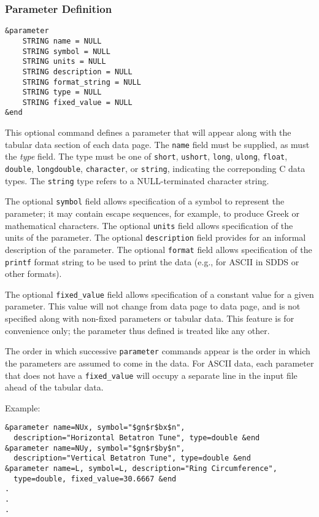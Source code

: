 \documentclass[11pt]{article}
\begin{document}
\subsubsection{Parameter Definition}
\begin{verbatim}
&parameter
    STRING name = NULL
    STRING symbol = NULL
    STRING units = NULL
    STRING description = NULL
    STRING format_string = NULL
    STRING type = NULL
    STRING fixed_value = NULL
&end
\end{verbatim}

This optional command defines a parameter that will appear along with the tabular data section of each data page.  The {\tt name} field must be supplied, as must the {\em type} field.  The type must be one of {\tt short}, {\tt ushort}, {\tt long}, {\tt ulong}, {\tt float}, {\tt double}, {\tt longdouble}, {\tt character}, or {\tt string}, indicating the correponding C data types.  The {\tt string} type refers to a NULL-terminated character string.

The optional {\tt symbol} field allows specification of a symbol to represent the parameter; it may contain escape sequences, for example, to produce Greek or mathematical characters.  The optional {\tt units} field allows specification of the units of the parameter.  The optional {\tt description} field provides for an informal description of the parameter.  The optional {\tt format} field allows specification of the {\tt printf} format string to be used to print the data (e.g., for ASCII in SDDS or other formats).

The optional {\tt fixed\_value} field allows specification of a constant value for a given parameter.  This value will not change from data page to data page, and is not specified along with non-fixed parameters or tabular data.  This feature is for convenience  only; the parameter thus defined is treated like any other.

The order in which successive {\tt parameter} commands appear is the order in which the parameters are assumed to come in the data.  For ASCII data, each parameter that does not have a {\tt fixed\_value} will occupy a separate line in the input file ahead of the tabular data.

Example:
\begin{verbatim}
&parameter name=NUx, symbol="$gn$r$bx$n", 
  description="Horizontal Betatron Tune", type=double &end
&parameter name=NUy, symbol="$gn$r$by$n", 
  description="Vertical Betatron Tune", type=double &end
&parameter name=L, symbol=L, description="Ring Circumference", 
  type=double, fixed_value=30.6667 &end
.
.
.
\end{verbatim}
\end{document}
